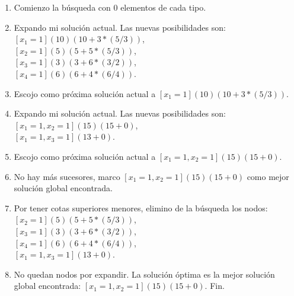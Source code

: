 \documentclass{article}
\begin{document}
\begin{enumerate}

\item Comienzo la búsqueda con $0$ elementos de cada tipo.

\item Expando mi solución actual. Las nuevas posibilidades son: \\
$[x_1=1] (10)(10+3*(5/3))$,\\
$[x_2=1] (5)(5+5*(5/3))$,\\
$[x_3=1] (3)(3+6*(3/2))$,\\
$[x_4=1] (6)(6+4*(6/4))$.

\item Escojo como próxima solución actual a $[x_1=1] (10)(10+3*(5/3))$.

\item Expando mi solución actual. Las nuevas posibilidades son:\\
$[x_1=1,x_2=1] (15)(15+0)$,\\
$[x_1=1,x_3=1] (13+0)$.

\item Escojo como próxima solución actual a $[x_1=1,x_2=1] (15)(15+0)$.

\item No hay más sucesores, marco $[x_1=1,x_2=1] (15)(15+0)$ como mejor solución global encontrada.

\item Por tener cotas superiores menores, elimino de la búsqueda los nodos:\\
$[x_2=1] (5)(5+5*(5/3))$,\\
$[x_3=1] (3)(3+6*(3/2))$,\\
$[x_4=1] (6)(6+4*(6/4))$,\\
$[x_1=1,x_3=1] (13+0)$.

\item No quedan nodos por expandir. La solución óptima es la mejor solución global encontrada: $[x_1=1,x_2=1] (15)(15+0)$. Fin.

\end{enumerate}
\end{document}
